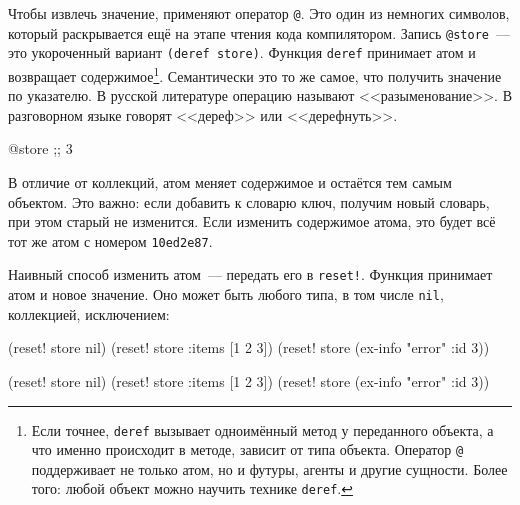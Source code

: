 Чтобы извлечь значение, применяют оператор \verb|@|. Это один из немногих
символов, который раскрывается ещё на этапе чтения кода компилятором. Запись
\verb|@store|~--- это укороченный вариант \verb|(deref store)|. Функция
\verb|deref| принимает атом и возвращает содержимое\footnote{Если точнее,
  \texttt{deref} вызывает одноимённый метод у переданного объекта, а что именно
  происходит в методе, зависит от типа объекта. Оператор \texttt{@} поддерживает
  не только атом, но и футуры, агенты и другие сущности. Более того: любой
  объект можно научить технике \texttt{deref}.}. Семантически это то же самое,
что получить значение по указателю. В русской литературе операцию называют
<<разыменование>>. В разговорном языке говорят <<дереф>> или <<дерефнуть>>.


\begin{english}
  \begin{clojure}
@store ;; 3
  \end{clojure}
\end{english}

В отличие от коллекций, атом меняет содержимое и остаётся тем самым
объектом. Это важно: если добавить к словарю ключ, получим новый словарь, при
этом старый не изменится. Если изменить содержимое атома, это будет всё тот
же атом с номером \verb|10ed2e87|.


Наивный способ изменить атом~--- передать его в \verb|reset!|. Функция принимает атом
и новое значение. Оно может быть любого типа, в том числе \verb|nil|,
коллекцией, исключением:

\ifnarrow

\begin{english}
  \begin{clojure}
(reset! store nil)
(reset! store {:items [1 2 3]})
(reset! store (ex-info "error"
                {:id 3}))
  \end{clojure}
\end{english}

\else

\begin{english}
  \begin{clojure}
(reset! store nil)
(reset! store {:items [1 2 3]})
(reset! store (ex-info "error" {:id 3}))
  \end{clojure}
\end{english}
\fi

